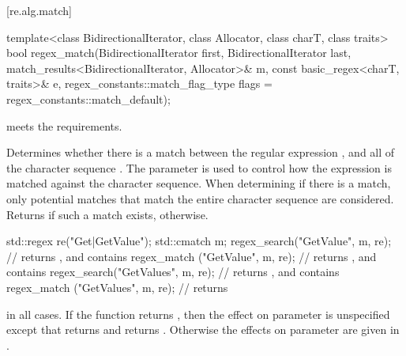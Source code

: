 [re.alg.match]{}
%
\begin{itemdecl}
template<class BidirectionalIterator, class Allocator, class charT, class traits>
  bool regex_match(BidirectionalIterator first, BidirectionalIterator last,
                   match_results<BidirectionalIterator, Allocator>& m,
                   const basic_regex<charT, traits>& e,
                   regex_constants::match_flag_type flags = regex_constants::match_default);
\end{itemdecl}

\begin{itemdescr}
\pnum
\expects
{} meets the
 requirements.

\pnum
\effects
Determines whether there is a match between the
regular expression , and all of the character
sequence . The parameter  is
used to control how the expression is matched against the character
sequence. When determining if there is a match, only potential matches
that match the entire character sequence are considered.
Returns  if such a match exists, 
otherwise.
\begin{example}
\begin{codeblock}
std::regex re("Get|GetValue");
std::cmatch m;
regex_search("GetValue", m, re);        // returns , and  contains 
regex_match ("GetValue", m, re);        // returns , and  contains 
regex_search("GetValues", m, re);       // returns , and  contains 
regex_match ("GetValues", m, re);       // returns 
\end{codeblock}
\end{example}

\pnum
\ensures
{} in all cases.
If the function returns , then the effect
on parameter  is unspecified except that 
returns  and  returns .
Otherwise the effects on parameter  are given in
.
\end{itemdescr}

